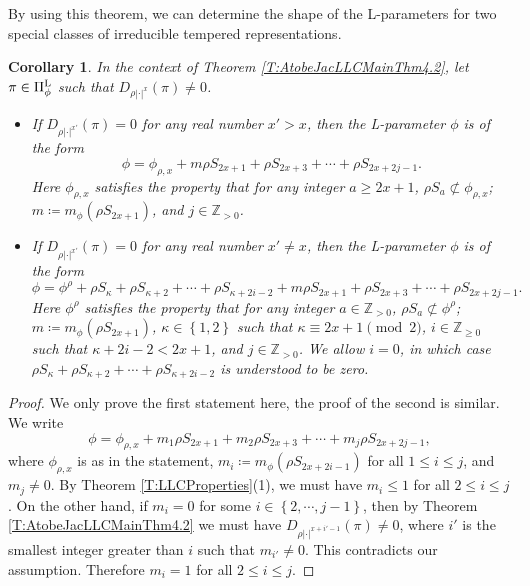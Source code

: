 \documentclass[11pt,letterpaper]{amsart}
\theoremstyle{plain}
\newcounter{theorem}[section]
\numberwithin{theorem}{section}
\numberwithin{equation}{subsection}
\newtheorem{Cor}[theorem]{Corollary}
\theoremstyle{remark}
\newcommand{\Z}{\mathbb{Z}}
\def\LP{\Pi^{\rm L}} %
\begin{document}
By using this theorem, we can determine the shape of the L-parameters for two special classes of irreducible tempered representations.

\begin{Cor}\label{C:TempShapeofL-parameter}
In the context of Theorem \ref{T:AtobeJacLLCMainThm4.2}, let $\pi\in\LP_\phi$ such that $D_{\rho|\cdot|^x}\left(\pi\right)\neq 0$. 
\begin{itemize}
       \item If $D_{\rho|\cdot|^{x'}}\left(\pi\right)=0$ for any real number $x'>x$, then the L-parameter $\phi$ is of the form
       \[
            \phi = \phi_{\rho,x} + m\rho S_{2x+1} + \rho S_{2x+3} + \cdots + \rho S_{2x+2j-1}.
       \]
       Here $\phi_{\rho,x}$ satisfies the property that for any integer $a\geq 2x+1$, $\rho S_a\not\subset \phi_{\rho,x}$; $m\coloneqq m_\phi\left(\rho S_{2x+1}\right)$, and $j\in\Z_{> 0}$.  

       \vskip 5pt

       \item If $D_{\rho|\cdot|^{x'}}\left(\pi\right)=0$ for any real number $x'\neq x$, then the L-parameter $\phi$ is of the form
       \[
            \phi = \phi^{\rho} + \rho S_{\kappa} + \rho S_{\kappa+2} + \cdots + \rho S_{\kappa + 2i-2} + m\rho S_{2x+1} + \rho S_{2x+3} + \cdots + \rho S_{2x+2j-1}.
       \]
       Here $\phi^{\rho}$ satisfies the property that for any integer $a\in\Z_{>0}$, $\rho S_a\not\subset \phi^{\rho}$; $m\coloneqq m_\phi\left(\rho S_{2x+1}\right)$, $\kappa\in\left\{1,2\right\}$ such that $\kappa\equiv 2x+1\pmod 2$, $i\in\Z_{\geq 0}$ such that $\kappa+2i-2<2x+1$, and $j\in\Z_{> 0}$. We allow $i=0$, in which case $\rho S_{\kappa} + \rho S_{\kappa+2} + \cdots + \rho S_{\kappa + 2i-2}$ is understood to be zero.
    \end{itemize}   
\end{Cor}

\vskip 5pt

\begin{proof}
We only prove the first statement here, the proof of the second is similar. We write
\[
    \phi = \phi_{\rho,x} + m_1\rho S_{2x+1} + m_2\rho S_{2x+3} + \cdots + m_j\rho S_{2x+2j-1},
\] 
where $\phi_{\rho,x}$ is as in the statement, $m_i\coloneqq m_\phi\left(\rho S_{2x+2i-1}\right)$ for all $1\leq i\leq j$, and $m_j\neq 0$. By Theorem \ref{T:LLCProperties}(1), we must have $m_i\leq 1$ for all $2\leq i\leq j$. On the other hand, if $m_i=0$ for some $i\in\left\{2,\cdots,j-1\right\}$, then by Theorem \ref{T:AtobeJacLLCMainThm4.2} we must have $D_{\rho|\cdot|^{x+i'-1}}\left(\pi\right)\neq 0$, where $i'$ is the smallest integer greater than $i$ such that $m_{i'}\neq 0$. This contradicts our assumption. Therefore $m_i=1$ for all $2\leq i\leq j$.

\end{proof}
\end{document}
